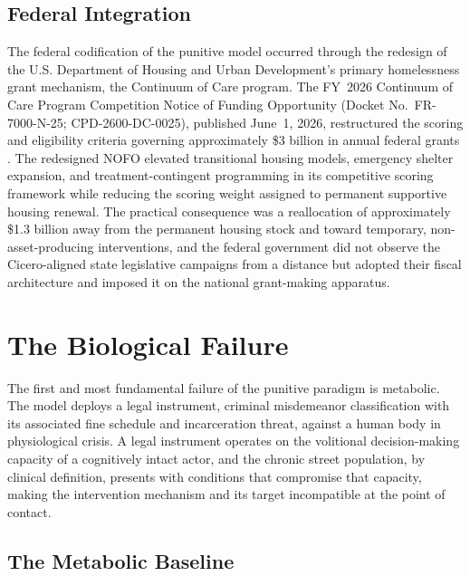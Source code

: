 \documentclass[12pt, letterpaper]{article}
\begin{document}
\subsection{Federal Integration}

The federal codification of the punitive model occurred through the redesign of the U.S. Department of Housing and Urban Development's primary homelessness grant mechanism, the Continuum of Care program. The FY~2026 Continuum of Care Program Competition Notice of Funding Opportunity (Docket No.\ FR-7000-N-25; CPD-2600-DC-0025), published June~1, 2026, restructured the scoring and eligibility criteria governing approximately \$3 billion in annual federal grants \citep{hud_nofo_2026}. The redesigned NOFO elevated transitional housing models, emergency shelter expansion, and treatment-contingent programming in its competitive scoring framework while reducing the scoring weight assigned to permanent supportive housing renewal. The practical consequence was a reallocation of approximately \$1.3 billion away from the permanent housing stock and toward temporary, non-asset-producing interventions, and the federal government did not observe the Cicero-aligned state legislative campaigns from a distance but adopted their fiscal architecture and imposed it on the national grant-making apparatus.


\section{The Biological Failure}

The first and most fundamental failure of the punitive paradigm is metabolic. The model deploys a legal instrument, criminal misdemeanor classification with its associated fine schedule and incarceration threat, against a human body in physiological crisis. A legal instrument operates on the volitional decision-making capacity of a cognitively intact actor, and the chronic street population, by clinical definition, presents with conditions that compromise that capacity, making the intervention mechanism and its target incompatible at the point of contact.

\subsection{The Metabolic Baseline}
\end{document}
